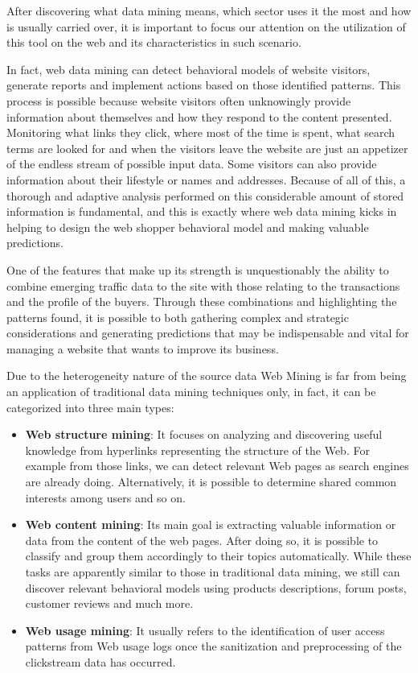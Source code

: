 After discovering what data mining means, which sector uses it the most and how is usually carried over, it is important to focus our attention on the utilization of this tool on the web and its characteristics in such scenario.

In fact, web data mining can detect behavioral models of website visitors, generate reports and implement actions based on those identified patterns.
This process is possible because website visitors often unknowingly provide information about themselves and how they respond to the content presented. Monitoring what links they click, where most of the time is spent, what search terms are looked for and when the visitors leave the website are just an appetizer of the endless stream of possible input data.
Some visitors can also provide information about their lifestyle or names and addresses.
Because of all of this, a thorough and adaptive analysis performed on this considerable amount of stored information is fundamental, and this is exactly where web data mining kicks in helping to design the web shopper behavioral model and making valuable predictions.

One of the features that make up its strength is unquestionably the ability to combine emerging traffic data to the site with those relating to the transactions and the profile of the buyers.
Through these combinations and highlighting the patterns found, it is possible to both gathering complex and strategic considerations and generating predictions that may be indispensable and vital for managing a website that wants to improve its business.

Due to the heterogeneity nature of the source data Web Mining is far from being an application of traditional data mining techniques only, in fact, it can be categorized into three main types:

\begin{itemize}
  \item \textbf{Web structure mining}:  It focuses on analyzing and discovering useful knowledge from hyperlinks representing the structure of the Web. For example from those links, we can detect relevant Web pages as search engines are already doing. Alternatively, it is possible to determine shared common interests among users and so on.
  \item \textbf{Web content mining}: Its main goal is extracting valuable information or data from the content of the web pages. After doing so, it is possible to classify and group them accordingly to their topics automatically. While these tasks are apparently similar to those in traditional data mining, we still can discover relevant behavioral models using products descriptions, forum posts, customer reviews and much more.
  \item \textbf{Web usage mining}: It usually refers to the identification of user access patterns from Web usage logs once the sanitization and preprocessing of the clickstream data has occurred.
\end{itemize} 


